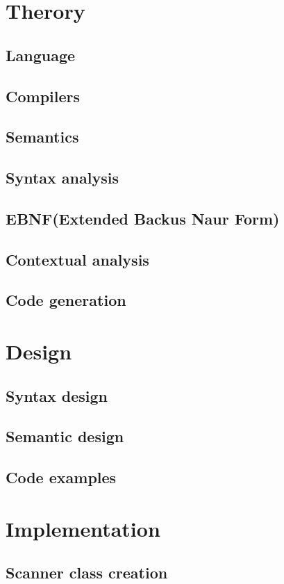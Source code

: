\chapter{Therory}
	\section{Language}
	\section{Compilers}
	\section{Semantics}
	\section{Syntax analysis}
	\section{EBNF(Extended Backus Naur Form)}
	\section{Contextual analysis}
	\section{Code generation}
\chapter{Design}
	\section{Syntax design}
	\section{Semantic design}
	\section{Code examples}
\chapter{Implementation}
	\section{Scanner class creation}
